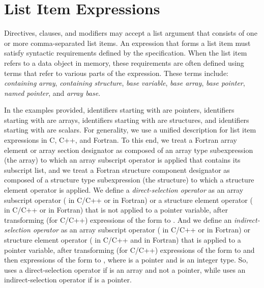 \section{List Item Expressions}
\label{sec:list_item_expressions}

Directives, clauses, and modifiers may accept a list argument that consists of
one or more comma-separated list items.  An expression that forms a list item must
satisfy syntactic requirements defined by the specification. When the list item
refers to a data object in memory, these requirements are often defined using
terms that refer to various parts of the expression. These terms include:
\emph{containing array}, \emph{containing structure}, \emph{base variable},
\emph{base array}, \emph{base pointer}, \emph{named pointer}, and \emph{array
base}.

In the examples provided, identifiers starting with  are pointers,
identifiers starting with  are arrays, identifiers starting with
 are structures, and identifiers starting with  are scalars.
For generality, we use a unified description for list item expressions in C,
C++, and Fortran. To this end, we treat a Fortran array element or array
section designator as composed of an array type subexpression (the array) to
which an array subscript operator is applied that contains its subscript list,
and we treat a Fortran structure component designator as composed of a
structure type subexpression (the structure) to which a structure element
operator is applied. We define a \emph{direct-selection operator} as an array
subscript operator (\ucode{[...]} in C/C++ or  in Fortran) or a
structure element operator ( in C/C++ or \ucode{\%} in Fortran) that
is not applied to a pointer variable, after transforming (for C/C++)
expressions of the form  to .  And we define an
\emph{indirect-selection operator} as an array subscript operator
(\ucode{[...]} in C/C++ or  in Fortran) or structure element
operator (\ucode{->} in C/C++ and \ucode{\%} in Fortran) that is applied to a
pointer variable, after transforming (for C/C++) expressions of the form
 to  and then expressions of the form  to
, where  is a pointer and  is an integer type.
So,  uses a direct-selection operator if  is an array and
not a pointer, while  uses an indirect-selection operator if
 is a pointer.

